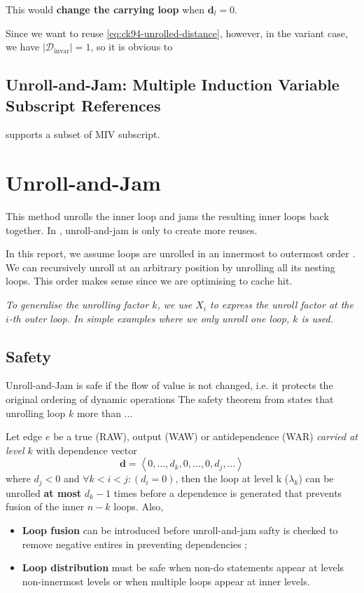 This would \textbf{change the carrying loop} when $\mathbf{d}_{l} = 0$.

Since we want to reuse \cref{eq:ck94-unrolled-distance}, however, in the
variant case, we have $\left| \mathcal{D}_{\text{invar}} \right| = 1$, so it is obvious to


\subsection{Unroll-and-Jam: Multiple Induction Variable Subscript References}

\cite{carrPhd} supports a subset of MIV subscript. 

\section{Unroll-and-Jam}
\label{sec:ck94-unroll-and-jam}
This method unrolls the inner loop and jams the resulting inner loops back
together. In \cite{carrKennedy1994}, unroll-and-jam is only to create more reuses.

In this report, we assume loops are unrolled in an innermost to outermost order
\cite{carrKennedy1994}. We can recursively unroll at an arbitrary
position by unrolling all its nesting loops. This order makes sense since we are
optimising to cache hit.


\textit{To generalise the unrolling factor $k$, we use \textbf{$X_{i}$} to express the unroll
factor at the $i$-th outer loop. In simple examples where we only unroll one
loop, $k$ is used.}

\subsection{Safety}
Unroll-and-Jam is safe if the flow of value is not changed, i.e. it protects the
original ordering of dynamic operations
The safety theorem from  states that unrolling
loop $k$ more than ...

Let edge $e$ be a true (RAW), output (WAW) or antidependence (WAR)
\textit{carried at level $k$} with dependence vector
\[
  \mathbf{d} = \left\langle 0, \dots, d_{k}, 0, \dots, 0, d_{j}, \dots
  \right\rangle
\]
where $d_{j} < 0$ and $\forall k < i < j: (d_{i} = 0)$, then the loop at level k
($\lambda_{k}$) can be unrolled \textbf{at most} $d_{k}-1$ times before a
dependence is generated that prevents fusion of the inner $n-k$ loops. Also,
\begin{itemize}[nosep]
  \item \textbf{Loop fusion} can be introduced before unroll-and-jam safty is
    checked to remove negative entires in preventing dependencies ;
  \item \textbf{Loop distribution} must be safe when non-do statements appear at
    levels non-innermost levels or when multiple loops appear at inner levels.
\end{itemize}



